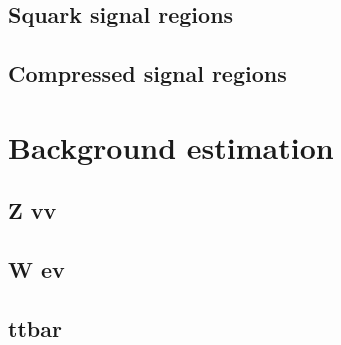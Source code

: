 \subsection{Squark signal regions}
\subsection{Compressed signal regions}

\section{Background estimation}

\subsection{Z vv  }
\subsection{W ev  }
\subsection{ttbar}

